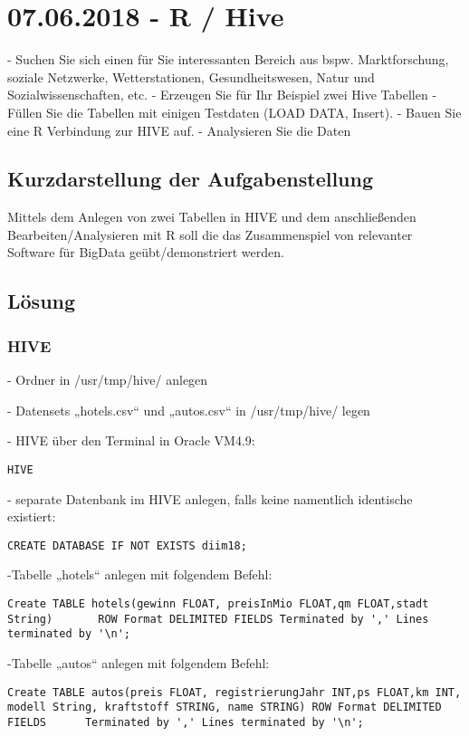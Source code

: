 \section{07.06.2018 - R / Hive}
- Suchen Sie sich einen für Sie interessanten Bereich aus bspw. Marktforschung, soziale Netzwerke, Wetterstationen, Gesundheitswesen, Natur und Sozialwissenschaften, etc.
- Erzeugen Sie für Ihr Beispiel zwei Hive Tabellen
- Füllen Sie die Tabellen mit einigen Testdaten (LOAD DATA, Insert).
- Bauen Sie eine R Verbindung zur HIVE auf.
- Analysieren Sie die Daten

\subsection*{Kurzdarstellung der Aufgabenstellung}
Mittels dem Anlegen von zwei Tabellen in HIVE und dem anschließenden Bearbeiten/Analysieren mit R soll die das Zusammenspiel von relevanter Software für BigData geübt/demonstriert werden.
\subsection*{Lösung}
\subsubsection*{HIVE}

- Ordner in /usr/tmp/hive/ anlegen

- Datensets „hotels.csv“ und „autos.csv“  in /usr/tmp/hive/ legen

- HIVE über den Terminal in Oracle VM4.9:
\begin{lstlisting}
HIVE
\end{lstlisting}

- separate Datenbank im HIVE anlegen, falls keine namentlich identische existiert:
\begin{lstlisting}
CREATE DATABASE IF NOT EXISTS diim18;
\end{lstlisting}

-Tabelle „hotels“ anlegen mit folgendem Befehl:
\begin{lstlisting}
Create TABLE hotels(gewinn FLOAT, preisInMio FLOAT,qm FLOAT,stadt String)       ROW Format DELIMITED FIELDS Terminated by ',' Lines terminated by '\n';
\end{lstlisting}

-Tabelle „autos“ anlegen mit folgendem Befehl:
\begin{lstlisting}
Create TABLE autos(preis FLOAT, registrierungJahr INT,ps FLOAT,km INT,  modell String, kraftstoff STRING, name STRING) ROW Format DELIMITED FIELDS      Terminated by ',' Lines terminated by '\n';
\end{lstlisting}

